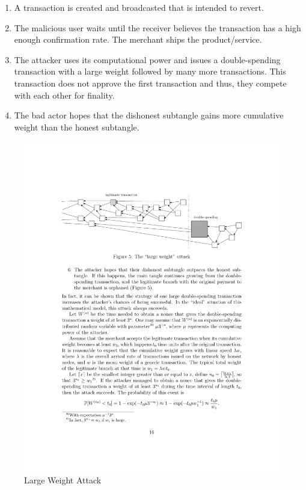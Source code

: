 \begin{enumerate}
    \item A transaction is created and broadcasted that is intended to revert.
    \item The malicious user waits until the receiver believes the transaction has a high enough confirmation rate. The merchant ships the product/service.
    \item The attacker uses its computational power and issues a double-spending transaction with a large weight followed by many more transactions. This transaction does not approve the first transaction and thus, they compete with each other for finality.
    \item The bad actor hopes that the dishonest subtangle gains more cumulative weight than the honest subtangle.
\end{enumerate}

\begin{figure}[H]
    \centering
    \includegraphics[width=12cm]{images/large-weight-attack.pdf}
    \caption{Large Weight Attack \cite{the-tangle}}
    \label{fig:large-weight-attack}
\end{figure}

